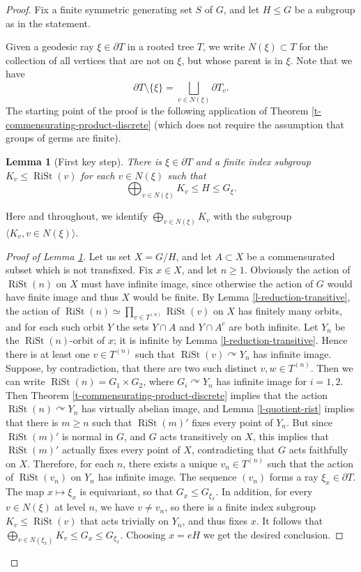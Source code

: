 \documentclass[11pt]{amsart}
\newcommand{\acts}{\ensuremath{\curvearrowright}}%
\newcommand{\rist}{\ensuremath{\operatorname{RiSt}}}%
\theoremstyle{definition}
\theoremstyle{plain}
\newtheorem{main thm}{Theorem}
\newtheorem{lemma}[defin]{Lemma}
\theoremstyle{remark}
\theoremstyle{plain}
\begin{document}
\begin{proof}
Fix a finite symmetric generating set $S$ of $G$, and let  $H\le G$ be a subgroup as in the statement. 


Given a geodesic ray $\xi\in \partial T$ in a rooted tree $T$, we write $N(\xi)\subset T$ for the collection of all vertices that are not on $\xi$, but whose parent is in $\xi$.   Note that we have	\[\partial T\setminus \{\xi\}=\bigsqcup_{v\in N(\xi)} \partial T_v.\] 
The starting point of the proof is the following application of Theorem \ref{t-commensurating-product-discrete} (which does not require the assumption that groups of germs are finite).

\begin{lemma}[First key step] \label{l-commensurating-branch}
There is $\xi\in \partial T$ and a finite index subgroup $K_v \le \rist(v)$ for each  $v\in  N(\xi)$ such that 
	\begin{equation}\label{e-subgroup} \bigoplus_{v\in N(\xi)} K_v \le H \le G_{\xi}.\end{equation}\end{lemma}
Here and throughout, we identify $\bigoplus_{v\in N(\xi)} K_v$ with the subgroup $\langle K_v, v\in N(\xi)\rangle$.
\begin{proof}[Proof of Lemma \ref{l-commensurating-branch}]
Let us set $X=G/H$, and let $A\subset X$ be a commensurated subset which is not transfixed. Fix $x\in X$, and let $n\ge 1$. Obviously the action of $\rist(n)$ on $X$ must have infinite image, since otherwise the action of $G$ would have finite image and thus $X$ would be finite. By Lemma \ref{l-reduction-transitive}, the action of $\rist(n)\simeq \prod_{v\in T^{(n)}}\rist(v)$ on $X$ has finitely many orbits, and for each such orbit $Y$ the sets $Y\cap A$ and $Y\cap A^c$ are both infinite.  Let $Y_n$ be the $\rist(n)$-orbit of $x$; it is infinite by Lemma \ref{l-reduction-transitive}. Hence there is at least one $v\in T^{(n)}$ such that $\rist(v)\acts Y_n$ has infinite image. Suppose, by contradiction, that there are two such distinct $v, w\in T^{(n)}$. Then we can write $\rist(n)=G_1\times G_2$, where $G_i\acts Y_n$ has infinite image for $i=1, 2$. Then  Theorem \ref{t-commensurating-product-discrete} implies that the action $\rist(n)\acts Y_n$ has virtually abelian image, and Lemma \ref{l-quotient-rist} implies that there is $m\ge n$ such that $\rist(m)'$ fixes every point of $Y_n$. But since $\rist(m)'$ is normal in $G$, and $G$ acts transitively on $X$, this implies that $\rist(m)'$ actually fixes every point of $X$, contradicting that $G$ acts faithfully on $X$.  Therefore, for each $n$, there exists a unique $v_n\in T^{(n)}$ such that the action of $\rist(v_n)$ on $Y_n$ has infinite image. The sequence $(v_n)$ forms a ray $\xi_x\in \partial T$. The map $x\mapsto \xi_x$ is equivariant, so that $G_x\le G_{\xi_x}$. In addition, for every $v\in N(\xi)$ at level $n$, we have $v\neq v_n$, so there is a finite index subgroup $K_v\le \rist(v)$ that acts trivially on $Y_{n}$, and thus fixes $x$. It follows that $\bigoplus_{v\in N(\xi_x)} K_v\le G_x\le G_{\xi_x}$. Choosing $x=eH$ we get the desired conclusion. \qedhere
\end{proof}




\end{proof}
\end{document}
